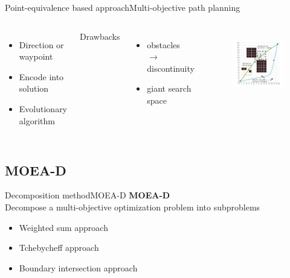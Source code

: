\begin{frame}{Point-equivalence based approach}{Multi-objective path planning}
\begin{columns}
\begin{itemize}
\item Direction or waypoint 
\item Encode into solution
\item Evolutionary algorithm
\end{itemize}
Drawbacks
\begin{itemize}
\item obstacles $ \rightarrow $ discontinuity
\item giant search space
\end{itemize}
	\begin{figure}
		\centering
		\includegraphics[width=.9\linewidth]{figure/chain_based_solution.png}
		\label{fig:chain_based_solution}
	\end{figure}
\end{columns}
\end{frame}

\subsection{MOEA-D}

\begin{frame}{Decomposition method}{MOEA-D}
    {\bf MOEA-D} \\
	Decompose a multi-objective optimization problem into subproblems
	\begin{itemize}
		\item Weighted sum approach
		\item Tchebycheff approach
		\item Boundary intersection approach
	\end{itemize}
\end{frame}

